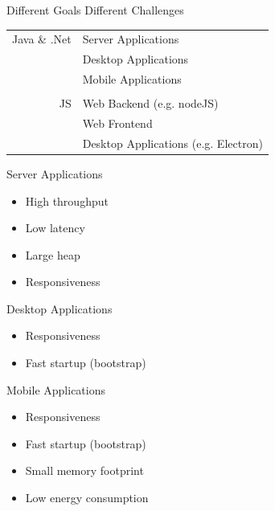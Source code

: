 \documentclass[
14pt,
aspectratio=169,
usenames,
dvipsnames,
x11names]{beamer}
\begin{document}
\begin{frame}{Different Goals Different Challenges}
  \centering
  \begin{tabular}{r l}
   \alert{Java \& .Net} & Server Applications                  \\
                        & Desktop Applications                 \\
                        & Mobile Applications                  \\
                                                               \\
   \alert{JS}           & Web Backend (e.g. nodeJS)            \\
                        & Web Frontend                         \\
                        & Desktop Applications (e.g. Electron) \\
  \end{tabular}
\end{frame}

\begin{frame}{Server Applications}
  \begin{itemize}  \setlength{\itemsep}{\fill}
  \item High throughput
  \item Low latency
  \item Large heap
  \item Responsiveness
  \end{itemize}
\end{frame}

\begin{frame}{Desktop Applications}
  \begin{itemize}  \setlength{\itemsep}{\fill}
  \item Responsiveness
  \item Fast startup (bootstrap)
  \end{itemize}
\end{frame}

\begin{frame}{Mobile Applications}
  \begin{itemize}  \setlength{\itemsep}{\fill}
  \item Responsiveness
  \item Fast startup (bootstrap)
  \item Small memory footprint
  \item Low energy consumption
  \end{itemize}
\end{frame}
\end{document}
